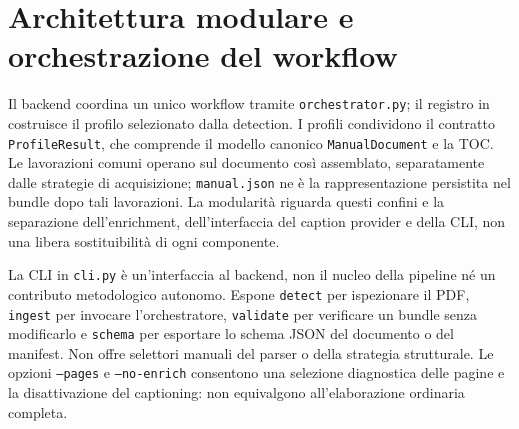 \section{Architettura modulare e orchestrazione del workflow}
\label{sec:architettura}

Il backend coordina un unico workflow tramite \texttt{orchestrator.py}; il registro in  costruisce il profilo selezionato dalla detection. I profili condividono il contratto \texttt{ProfileResult}, che comprende il modello canonico \texttt{ManualDocument} e la TOC. Le lavorazioni comuni operano sul documento così assemblato, separatamente dalle strategie di acquisizione; \texttt{manual.json} ne è la rappresentazione persistita nel bundle dopo tali lavorazioni. La modularità riguarda questi confini e la separazione dell'enrichment, dell'interfaccia del caption provider e della CLI, non una libera sostituibilità di ogni componente.

La CLI in \texttt{cli.py} è un'interfaccia al backend, non il nucleo della pipeline né un contributo metodologico autonomo. Espone \texttt{detect} per ispezionare il PDF, \texttt{ingest} per invocare l'orchestratore, \texttt{validate} per verificare un bundle senza modificarlo e \texttt{schema} per esportare lo schema JSON del documento o del manifest. Non offre selettori manuali del parser o della strategia strutturale. Le opzioni \texttt{--pages} e \texttt{--no-enrich} consentono una selezione diagnostica delle pagine e la disattivazione del captioning: non equivalgono all'elaborazione ordinaria completa.

